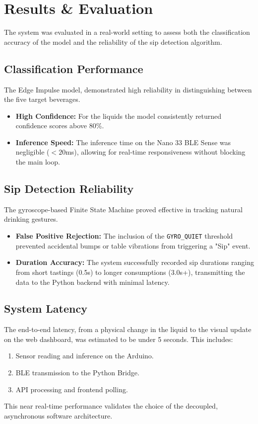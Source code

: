 \documentclass[12pt]{article}
\begin{document}
\section{Results \& Evaluation}
The system was evaluated in a real-world setting to assess both the classification accuracy of the model and the reliability of the sip detection algorithm.

\subsection{Classification Performance}
The Edge Impulse model, demonstrated high reliability in distinguishing between the five target beverages.
\begin{itemize}
    \item \textbf{High Confidence:} For the liquids the model consistently returned confidence scores above 80\%.
    \item \textbf{Inference Speed:} The inference time on the Nano 33 BLE Sense was negligible ($<20$ms), allowing for real-time responsiveness without blocking the main loop.
\end{itemize}

\subsection{Sip Detection Reliability}
The gyroscope-based Finite State Machine proved effective in tracking natural drinking gestures.
\begin{itemize}
    \item \textbf{False Positive Rejection:} The inclusion of the \texttt{GYRO\_QUIET} threshold prevented accidental bumps or table vibrations from triggering a "Sip" event.
    \item \textbf{Duration Accuracy:} The system successfully recorded sip durations ranging from short tastings (0.5s) to longer consumptions (3.0s+), transmitting the data to the Python backend with minimal latency.
\end{itemize}

\subsection{System Latency}
The end-to-end latency, from a physical change in the liquid to the visual update on the web dashboard, was estimated to be under 5 seconds. This includes:
\begin{enumerate}
    \item Sensor reading and inference on the Arduino.
    \item BLE transmission to the Python Bridge.
    \item API processing and frontend polling.
\end{enumerate}
This near real-time performance validates the choice of the decoupled, asynchronous software architecture.
\end{document}
